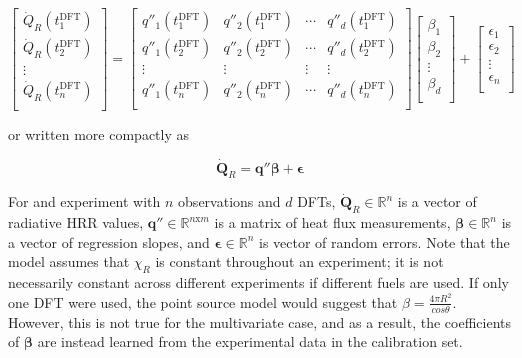 \documentclass{article}
\begin{document}
 \begin{equation}
  \label{eqn:linear_model_expanded}
 \begin{bmatrix}
  \dot{Q}_{R}(t^{\text{DFT}}_1) \\ 
  \dot{Q}_{R}(t^{\text{DFT}}_2) \\ 
  \vdots \\
  \dot{Q}_{R}(t^{\text{DFT}}_n) \\ 
  \end{bmatrix} = \begin{bmatrix}
  q''_1(t^{\text{DFT}}_1) & q''_2(t^{\text{DFT}}_1) & \cdots & q''_d(t^{\text{DFT}}_1) \\ 
  q''_1(t^{\text{DFT}}_2) & q''_2(t^{\text{DFT}}_2) & \cdots & q''_d(t^{\text{DFT}}_2) \\ 
  \vdots & \vdots & \vdots & \vdots \\ 
  q''_1(t^{\text{DFT}}_n) & q''_2(t^{\text{DFT}}_n) & \cdots & q''_d(t^{\text{DFT}}_n) \\ 
  \end{bmatrix}
   \begin{bmatrix}
  \beta_1 \\ 
  \beta_2 \\ 
  \vdots \\
  \beta_d \\ 
  \end{bmatrix} +
    \begin{bmatrix}
  \epsilon_1 \\ 
  \epsilon_2 \\ 
  \vdots \\
  \epsilon_n \\ 
  \end{bmatrix}
\end{equation}

\noindent or written more compactly as 

 \begin{equation}
  \label{eqn:linear_model}
    \boldsymbol{\dot{Q}}_{R}  = \boldsymbol{q}'' \boldsymbol{\beta} + \boldsymbol{\epsilon}
\end{equation}

For and experiment with $n$ observations and $d$ DFTs, $\boldsymbol{\dot{Q}}_{R} \in  \mathbb{R}^n$ is a vector of radiative HRR values, $\boldsymbol{q}'' \in \mathbb{R}^{n\text{x}m}$ is a matrix of heat flux measurements, $\boldsymbol{\beta} \in \mathbb{R}^n$ is a vector of regression slopes, and $\boldsymbol{\epsilon} \in \mathbb{R}^n$ is vector of random errors. Note that the model assumes that $\chi_R$ is constant throughout an experiment; it is not necessarily constant across different experiments if different fuels are used. If only one DFT were used, the point source model would suggest that $\beta = \frac{4 \pi R^2}{ cos \theta}$. However, this is not true for the multivariate case, and as a result, the coefficients of $\boldsymbol{\beta}$ are instead learned from the experimental data in the calibration set.
\end{document}
